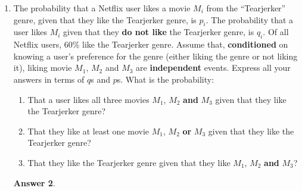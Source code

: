\documentclass[12pt]{article}
\renewcommand{\(}{\left(}
\renewcommand{\)}{\right)}
\theoremstyle{definition}
\newtheorem*{answer}{Answer}
\begin{document}
\begin{enumerate}
\begin{shaded}
\begin{answer}
    \end{answer}
    \end{shaded}
    \pagebreak
    \item The probability that a Netflix user likes a movie $M_i$ from the ``Tearjerker'' genre, given that they like the Tearjerker genre, is $p_i$. The probability that a user likes $M_i$ given that they \textbf{do not like} the Tearjerker genre, is $q_i$. Of all Netflix users, 60\% like the Tearjerker genre. Assume that, \textbf{conditioned} on knowing a user's preference for the genre (either liking the genre or not liking it), liking movie $M_1$, $M_2$ and $M_3$ are \textbf{independent} events. Express all your answers in terms of $q$s and $p$s. What is the probability:
    \begin{enumerate}
        \item That a user likes all three movies $M_1$, $M_2$ \textbf{and} $M_3$ given that they like the Tearjerker genre?
        \item That they like at least one movie $M_1$, $M_2$ \textbf{or} $M_3$ given that they like the Tearjerker genre?
        \item That they like the Tearjerker genre given that they like $M_1$, $M_2$ \textbf{and} $M_3$?
    \end{enumerate}
    
    \begin{shaded}
    \begin{answer}
    

\end{answer}
\end{shaded}
\end{enumerate}
\end{document}
